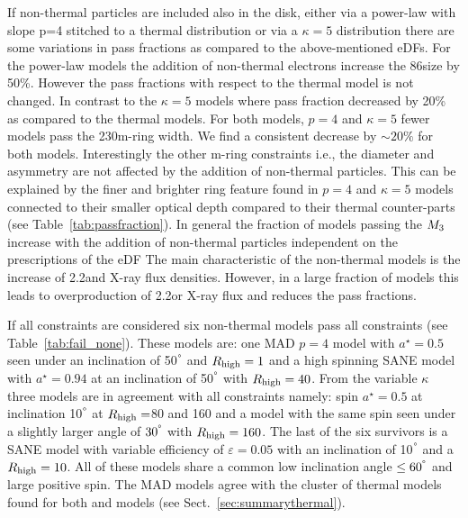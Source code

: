 If non-thermal particles are included also in the disk, either via a power-law with slope p=4 stitched to a thermal distribution or via a $\kappa=5$ distribution there are some variations in pass fractions as compared to the above-mentioned eDFs.
\newline For the power-law models the addition of non-thermal electrons increase the 86\GHz size by 50\%.
However the pass fractions with respect to the thermal model is not changed.
In contrast to the $\kappa=5$ models where pass fraction decreased by 20\% as compared to the thermal models.
\newline For both models, $p=4$ and $\kappa=5$ fewer models pass the 230\GHz m-ring width.
We find a consistent decrease by $\sim20\%$ for both models.
Interestingly the other m-ring constraints i.e., the diameter and asymmetry are not affected by the addition of non-thermal particles.
This can be explained by the finer and brighter ring feature found in $p=4$ and $\kappa=5$ models connected to their smaller optical depth compared to their thermal counter-parts (see Table~\ref{tab:passfraction}).
\newline In general the fraction of models passing the $M_{3}$ increase with the addition of non-thermal particles independent on the prescriptions of the eDF
\newline The main characteristic of the non-thermal models is the increase of 2.2\um and X-ray flux densities.
However, in a large fraction of models this leads to overproduction of 2.2\um or X-ray flux and reduces the pass fractions.



If all constraints are considered six non-thermal models pass all constraints (see Table~\ref{tab:fail_none}).
These models are: one \hamr MAD $p=4$ model with $a^\star=0.5$ seen under an inclination of 50$^\degree$ and  $R_{\rm high}=1$ and a high spinning SANE model with $a^\star=0.94$ at an inclination of 50$^\degree$ with $R_{\rm high}=40$.
From the \bhac variable $\kappa$ three models are in agreement with all constraints namely: spin $a^\star=0.5$ at inclination 10$^\degree$ at $R_{\rm high}=$80 and 160 and a model with the same spin seen under a slightly larger angle of $30^\degree$ with $R_{\rm high}=160$.
The last of the six survivors is a \bhac SANE model with variable efficiency of  $\varepsilon=0.05$ with an inclination of 10$^\degree$ and a $R_{\rm high}=10$.
All of these models share a common low inclination angle $\leq 60^\degree$ and large positive spin.
The MAD models agree with the cluster of thermal models found for both \bhac and \kharma models (see Sect.~\ref{sec:summarythermal}).

